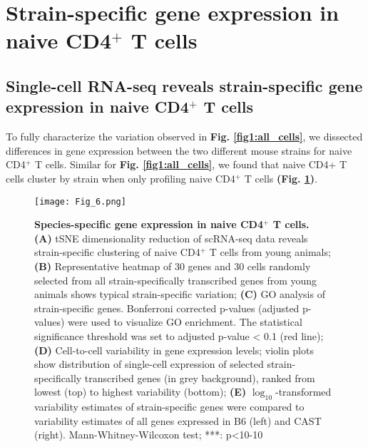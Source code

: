 \newpage

\section{Strain-specific gene expression in naive CD4$^+$ T cells}
\subsection*{Single-cell RNA-seq reveals strain-specific gene expression in naive CD4$^+$ T cells}

To fully characterize the variation observed in \textbf{Fig. \ref{fig1:all_cells}}, we dissected differences in gene expression between the two different mouse strains for naive CD4$^+$ T cells. Similar for \textbf{Fig. \ref{fig1:all_cells}}, we found that naive CD4+ T cells cluster by strain when only profiling naive CD4$^+$ T cells \textbf{(Fig. \ref{fig1:strain_specific})}.

\begin{figure}[!h]
\centering
\texttt{[image: Fig\_6.png]}
\caption[Species-specific gene expression in naive CD4$^+$ T cells]{\textbf{Species-specific gene expression in naive CD4$^+$ T cells.}\\
\textbf{(A)} tSNE dimensionality reduction of scRNA-seq data reveals strain-specific clustering of naive CD4$^+$ T cells from young animals; \textbf{(B)} Representative heatmap of 30 genes and 30 cells randomly selected from all strain-specifically transcribed genes from young animals shows typical strain-specific variation; \textbf{(C)}  GO analysis of strain-specific genes. Bonferroni corrected p-values (adjusted p-values) were used to visualize GO enrichment. The statistical significance threshold was set to adjusted p-value < 0.1 (red line); \textbf{(D)} Cell-to-cell variability in gene expression levels; violin plots show distribution of single-cell expression of selected strain-specifically transcribed genes (in grey background), ranked from lowest (top) to highest variability (bottom); \textbf{(E)} $\log_10$-transformed variability estimates of strain-specific genes were compared to variability estimates of all genes expressed in B6 (left) and CAST (right). Mann-Whitney-Wilcoxon test; ***: p<10-10}
\label{fig1:strain_specific}
\end{figure}

\newpage

